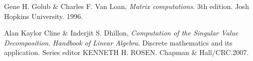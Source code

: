 \documentclass[12pt]{article}
\begin{document}



\item Gene H. Golub & Charles F. Van Loan, \textit{Matrix computations}. 3th edition. Josh Hopkins University. 1996.

\item Alan Kaylor Cline & Inderjit S. Dhillon, \textit{Computation of the Singular Value Decomposition}. \textit{Handbook of Linear Algebra}. Discrete mathematics and its application. Series editor KENNETH H. ROSEN. Chapman & Hall/CRC.2007.

\end{document}
